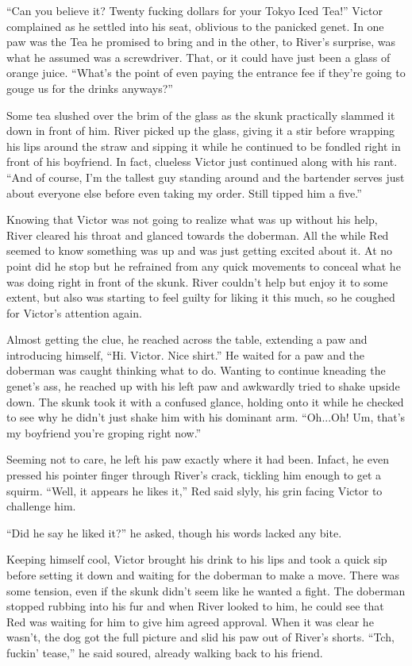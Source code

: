 ``Can you believe it? Twenty fucking dollars for your Tokyo Iced Tea!''
Victor complained as he settled into his seat, oblivious to the panicked
genet. In one paw was the Tea he promised to bring and in the other, to
River's surprise, was what he assumed was a screwdriver. That, or it
could have just been a glass of orange juice. ``What's the point of even
paying the entrance fee if they're going to gouge us for the drinks
anyways?''

Some tea slushed over the brim of the glass as the skunk practically
slammed it down in front of him. River picked up the glass, giving it a
stir before wrapping his lips around the straw and sipping it while he
continued to be fondled right in front of his boyfriend. In fact,
clueless Victor just continued along with his rant. ``And of course, I'm
the tallest guy standing around and the bartender serves just about
everyone else before even taking my order. Still tipped him a five.''

Knowing that Victor was not going to realize what was up without his
help, River cleared his throat and glanced towards the doberman. All the
while Red seemed to know something was up and was just getting excited
about it. At no point did he stop but he refrained from any quick
movements to conceal what he was doing right in front of the skunk.
River couldn't help but enjoy it to some extent, but also was starting
to feel guilty for liking it this much, so he coughed for Victor's
attention again.

Almost getting the clue, he reached across the table, extending a paw
and introducing himself, ``Hi. Victor. Nice shirt.'' He waited for a paw
and the doberman was caught thinking what to do. Wanting to continue
kneading the genet's ass, he reached up with his left paw and awkwardly
tried to shake upside down. The skunk took it with a confused glance,
holding onto it while he checked to see why he didn't just shake him
with his dominant arm. ``Oh...Oh! Um, that's my boyfriend you're groping
right now.''

Seeming not to care, he left his paw exactly where it had been. Infact,
he even pressed his pointer finger through River's crack, tickling him
enough to get a squirm. ``Well, it appears he likes it,'' Red said
slyly, his grin facing Victor to challenge him.

``Did he say he liked it?'' he asked, though his words lacked any bite.

Keeping himself cool, Victor brought his drink to his lips and took a
quick sip before setting it down and waiting for the doberman to make a
move. There was some tension, even if the skunk didn't seem like he
wanted a fight. The doberman stopped rubbing into his fur and when River
looked to him, he could see that Red was waiting for him to give him
agreed approval. When it was clear he wasn't, the dog got the full
picture and slid his paw out of River's shorts. ``Tch, fuckin' tease,''
he said soured, already walking back to his friend.

